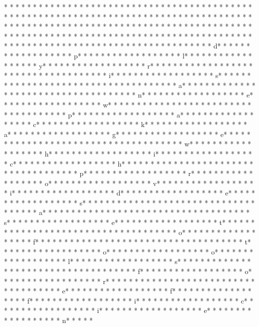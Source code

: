 * * *  * * *  * * *  *  * * *  *  * * *  * 	* * *  * * *  * * *  *  * * *  *  * * *  * 	* * *  * * *  * * *  *  * * *  *  * * *  * * *  * * *  *  * * *  *  * * *  * * *  * * *  *  * * *  *  * * *  *  * * *  * * *  * * *  *  * * *  *  * * *  *  * * *  * * *  * * *  *  * * *  *  * * *  *  * * *  * * *  * * *  *  * * *  *  * * *  *  * * *  * * *  * * *  *  * * *  *  * * *  *  * * *  * * *  * * *  *  * * *  *  * * *  *  * * *  * * *  * * *  *  * * *  *  * * *  *  * * *  * * *  * * *  *  * * *  *  * * *  * d* * *  * * *  * * *  *  * * *  *  * * *  * p* * *  * * *  * * *  *  * * *  *  * * *  * l* * *  * * *  * * *  *  * * *  *  * * *  * y* * *  * * *  * * *  *  * * *  *  * * *  * r* * *  * * *  * * *  *  * * *  *  * * *  *  * * *  * * *  * * *  *  * * *  *  * * *  * i* * *  * * *  * * *  *  * * *  *  * * *  * s* * *  * * *  * * *  *  * * *  *  * * *  *  * * *  * * *  * * *  *  * * *  *  * * *  * a* * *  * * *  * * *  *  * * *  *  * * *  *  * * *  * * *  * * *  *  * * *  *  * * *  * n* * *  * * *  * * *  *  * * *  *  * * *  * e* * *  * * *  * * *  *  * * *  *  * * *  * w* * *  * * *  * * *  *  * * *  *  * * *  *  * * *  * * *  * * *  *  * * *  *  * * *  * p* * *  * * *  * * *  *  * * *  *  * * *  * a* * *  * * *  * * *  *  * * *  *  * * *  * c* * *  * * *  * * *  *  * * *  *  * * *  * k* * *  * * *  * * *  *  * * *  *  * * *  * a* * *  * * *  * * *  *  * * *  *  * * *  * g* * *  * * *  * * *  *  * * *  *  * * *  * e* * *  * * *  * * *  *  * * *  *  * * *  *  * * *  * * *  * * *  *  * * *  *  * * *  * w* * *  * * *  * * *  *  * * *  *  * * *  * h* * *  * * *  * * *  *  * * *  *  * * *  * i* * *  * * *  * * *  *  * * *  *  * * *  * c* * *  * * *  * * *  *  * * *  *  * * *  * h* * *  * * *  * * *  *  * * *  *  * * *  *  * * *  * * *  * * *  *  * * *  *  * * *  * p* * *  * * *  * * *  *  * * *  *  * * *  * r* * *  * * *  * * *  *  * * *  *  * * *  * o* * *  * * *  * * *  *  * * *  *  * * *  * v* * *  * * *  * * *  *  * * *  *  * * *  * i* * *  * * *  * * *  *  * * *  *  * * *  * d* * *  * * *  * * *  *  * * *  *  * * *  * e* * *  * * *  * * *  *  * * *  *  * * *  * s* * *  * * *  * * *  *  * * *  *  * * *  *  * * *  * * *  * * *  *  * * *  *  * * *  * a* * *  * * *  * * *  *  * * *  *  * * *  *  * * *  * * *  * * *  *  * * *  *  * * *  * s* * *  * * *  * * *  *  * * *  *  * * *  * e* * *  * * *  * * *  *  * * *  *  * * *  * t* * *  * * *  * * *  *  * * *  *  * * *  *  * * *  * * *  * * *  *  * * *  *  * * *  * o* * *  * * *  * * *  *  * * *  *  * * *  * f* * *  * * *  * * *  *  * * *  *  * * *  *  * * *  * * *  * * *  *  * * *  *  * * *  * t* * *  * * *  * * *  *  * * *  *  * * *  * o* * *  * * *  * * *  *  * * *  *  * * *  * o* * *  * * *  * * *  *  * * *  *  * * *  * l* * *  * * *  * * *  *  * * *  *  * * *  * s* * *  * * *  * * *  *  * * *  *  * * *  *  * * *  * * *  * * *  *  * * *  *  * * *  * f* * *  * * *  * * *  *  * * *  *  * * *  * o* * *  * * *  * * *  *  * * *  *  * * *  * r* * *  * * *  * * *  *  * * *  *  * * *  *  * * *  * * *  * * *  *  * * *  *  * * *  * e* * *  * * *  * * *  *  * * *  *  * * *  * f* * *  * * *  * * *  *  * * *  *  * * *  * f* * *  * * *  * * *  *  * * *  *  * * *  * i* * *  * * *  * * *  *  * * *  *  * * *  * c* * *  * * *  * * *  *  * * *  *  * * *  * i* * *  * * *  * * *  *  * * *  *  * * *  * e* * *  * * *  * * *  *  * * *  *  * * *  * n* * *  * * 